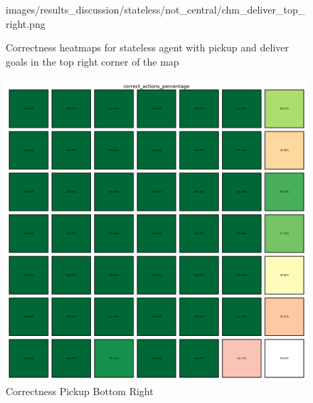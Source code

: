 \begin{figure}[h]
\begin{minipage}[b]{0.45\textwidth}
{      images/results_discussion/stateless/not_central/chm_deliver_top_right.png
    }
    \caption{Correctness Deliver Top Right}
    \label{fig:chm_deliver_top_right}
  \end{minipage}
  \caption{Correctness heatmaps for stateless agent with pickup and deliver
  goals in the top right corner of the map}
  \label{fig:stateless_top_right_correctness}
\end{figure}
\vspace{5mm}

\vspace{5mm}
\begin{figure}[h]
  \centering
  \begin{minipage}[b]{0.45\textwidth}
    \centering
    \includegraphics[width=\textwidth]{
      images/results_discussion/stateless/not_central/chm_pickup_bottom_right.png
    }
    \caption{Correctness Pickup Bottom Right}
    \label{fig:chm_pickup_bottom_right}
  \end{minipage}
  \hfill
  \begin{minipage}[b]{0.45\textwidth}
    \centering

\end{minipage}
\end{figure}
